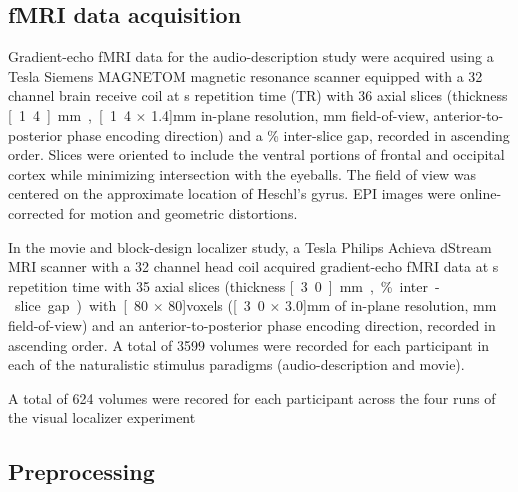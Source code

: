 \subsection{fMRI data acquisition}


Gradient-echo fMRI data for the audio-description study were acquired using a
\unit[7]{Tesla} Siemens MAGNETOM magnetic resonance scanner equipped with a 32
channel brain receive coil at \unit[2]{s} repetition time (TR) with 36 axial
slices (thickness \unit[1.4]{mm}, \unit[1.4 $\times$ 1.4]{mm} in-plane
resolution, \unit[224]{mm} field-of-view, anterior-to-posterior phase encoding
direction) and a \unit[10]{\%} inter-slice gap, recorded in ascending order.
Slices were oriented to include the ventral portions of frontal and occipital
cortex while minimizing intersection with the eyeballs.
The field of view was centered on the approximate location of Heschl's gyrus.
EPI images were online-corrected for motion and geometric distortions.

In the movie and block-design localizer study, a \unit[3]{Tesla} Philips Achieva
dStream MRI scanner with a 32 channel head coil acquired gradient-echo fMRI data
at \unit[2]{s} repetition time with
35 axial slices (thickness \unit[3.0]{mm}, \unit[10]{\%} inter-slice gap) with
\unit[80 $\times$ 80]{voxels} (\unit[3.0 $\times$ 3.0]{mm} of in-plane
resolution, \unit[240]{mm} field-of-view) and an anterior-to-posterior phase
encoding direction, recorded in ascending order.
A total of 3599 volumes were recorded for each participant in each of the
naturalistic stimulus paradigms (audio-description and movie).

A total of 624 volumes were recored for each participant across the four runs of
the visual localizer experiment


\subsection{Preprocessing}


